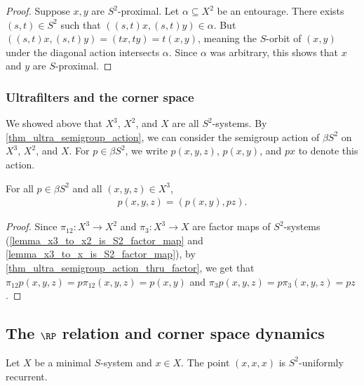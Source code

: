 \begin{proof}
\leanok{}
    Suppose $x, y$ are $S^2$-proximal.  Let $\alpha \subseteq X^2$ be an entourage.  There exists $(s,t) \in S^2$ such that $((s,t)x,(s,t)y) \in \alpha$.  But $((s,t)x,(s,t)y) = (tx,ty) = t(x,y)$, meaning the $S$-orbit of $(x,y)$ under the diagonal action intersects $\alpha$. Since $\alpha$ was arbitrary, this shows that $x$ and $y$ are $S$-proximal.
\end{proof}


\subsubsection{Ultrafilters and the corner space}

We showed above that $X^3$, $X^2$, and $X$ are all $S^2$-systems.  By \cref{thm_ultra_semigroup_action}, we can consider the semigroup action of $\beta S^2$ on $X^3$, $X^2$, and $X$.  For $p \in \beta S^2$, we write $p(x,y,z)$, $p(x,y)$, and $px$ to denote this action.

\begin{lemma}
\label{lemma_ultrafilter_action_on_X3}
\leanok{}
    For all $p \in \beta S^2$ and all $(x,y,z) \in X^3$,
    \begin{align}
    \label{eqn_ultrafilter_action_on_X3}
        p (x,y,z) = (p (x,y), p z).
    \end{align}
\end{lemma}

\begin{proof}
\leanok{}
    Since $\pi_{12}: X^3 \to X^2$ and $\pi_3: X^3 \to X$ are factor maps of $S^2$-systems (\cref{lemma_x3_to_x2_is_S2_factor_map} and \cref{lemma_x3_to_x_is_S2_factor_map}), by \cref{thm_ultra_semigroup_action_thru_factor}, we get that $\pi_{12} p (x,y,z) = p \pi_{12} (x,y,z) = p(x,y)$ and $\pi_3 p (x,y,z) = p \pi_3 (x,y,z) = pz$.
\end{proof}

\subsection{The $\RP$ relation and corner space dynamics}

\begin{theorem}
\label{thm_xxx_is_trtl_unif_rec_v3}
\leanok{}
    Let $X$ be a minimal $S$-system and $x \in X$.  The point $(x,x,x)$ is $S^2$-uniformly recurrent.
\end{theorem}

